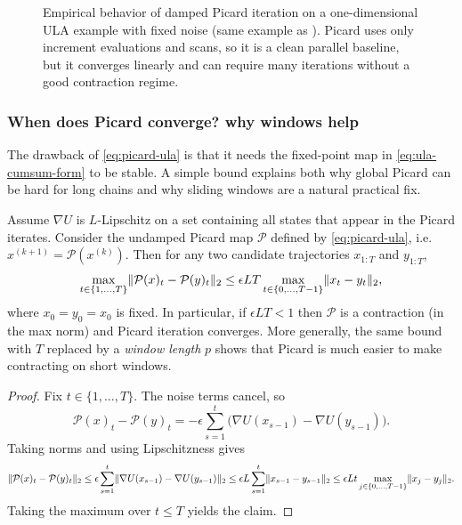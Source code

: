 \documentclass[11pt]{article}
\begin{document}
\begin{figure}[t]
  \centering
  
  \caption{Empirical behavior of damped Picard iteration on a one-dimensional ULA example with fixed noise (same example as ).
  Picard uses only increment evaluations and scans, so it is a clean parallel baseline, but it converges linearly and can require many iterations without a good contraction regime.}
  \label{fig:ula-picard-convergence}
\end{figure}

\subsubsection{When does Picard converge? why windows help}
\label{subsubsec:picard-when}

The drawback of \eqref{eq:picard-ula} is that it needs the fixed-point map in \eqref{eq:ula-cumsum-form} to be stable.
A simple bound explains both why global Picard can be hard for long chains and why sliding windows are a natural practical fix.

\begin{proposition}
\label{prop:picard-contraction}
Assume $\nabla U$ is $L$-Lipschitz on a set containing all states that appear in the Picard iterates.
Consider the undamped Picard map $\mathcal{P}$ defined by \eqref{eq:picard-ula}, i.e.\ $x^{(k+1)}=\mathcal{P}(x^{(k)})$.
Then for any two candidate trajectories $x_{1:T}$ and $y_{1:T}$,
\[
\max_{t\in\{1,\dots,T\}} \lVert\mathcal{P}(x)_{t}-\mathcal{P}(y)_{t}\rVert_2
\le \epsilon L T \max_{t\in\{0,\dots,T-1\}} \lVert x_t-y_t\rVert_2,
\]
where $x_0=y_0=x_0$ is fixed.
In particular, if $\epsilon L T<1$ then $\mathcal{P}$ is a contraction (in the max norm) and Picard iteration converges.
More generally, the same bound with $T$ replaced by a \emph{window length} $p$ shows that Picard is much easier to make contracting on short windows.%
\end{proposition}
\begin{proof}
Fix $t\in\{1,\dots,T\}$.
The noise terms cancel, so
\[
\mathcal{P}(x)_t-\mathcal{P}(y)_t
=-\epsilon\sum_{s=1}^t \bigl(\nabla U(x_{s-1})-\nabla U(y_{s-1})\bigr).
\]
Taking norms and using Lipschitzness gives
\[
\lVert\mathcal{P}(x)_t-\mathcal{P}(y)_t\rVert_2
\le \epsilon\sum_{s=1}^t \lVert\nabla U(x_{s-1})-\nabla U(y_{s-1})\rVert_2
\le \epsilon L \sum_{s=1}^t \lVert x_{s-1}-y_{s-1}\rVert_2
\le \epsilon L t \max_{j\in\{0,\dots,T-1\}} \lVert x_j-y_j\rVert_2.
\]
Taking the maximum over $t\le T$ yields the claim.%
\end{proof}
\end{document}
